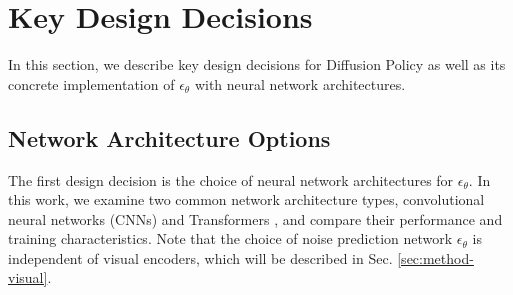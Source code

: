   
\section{Key Design Decisions}
 In this section, we describe key design decisions for Diffusion Policy as well as its concrete implementation of $\epsilon_\theta$ with neural network architectures.
 
\subsection{Network Architecture Options}
\label{sec:method-network}
The first design decision is the choice of neural network architectures for $\epsilon_\theta$. 
In this work, we examine two common network architecture types, convolutional neural networks (CNNs) \cite{ronneberger2015u} and Transformers \cite{vaswani2017attention}, and compare their performance and training characteristics. Note that the choice of noise prediction network $\epsilon_\theta$ is independent of visual encoders, which will be described in Sec. \ref{sec:method-visual}.

